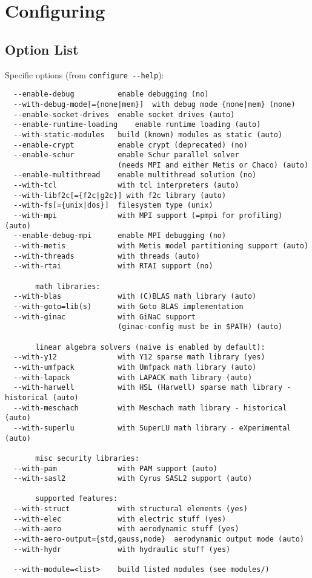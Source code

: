 \documentclass[10pt,dvips]{report}
\newcommand{\kw}[1]{\texttt{#1}}
\begin{document}
\section{Configuring}

\subsection{Option List}
Specific options (from \kw{configure -{}-help}):
{\small
\begin{verbatim}
  --enable-debug          enable debugging (no)
  --with-debug-mode[={none|mem}]  with debug mode {none|mem} (none)
  --enable-socket-drives  enable socket drives (auto)
  --enable-runtime-loading    enable runtime loading (auto)
  --with-static-modules   build (known) modules as static (auto)
  --enable-crypt          enable crypt (deprecated) (no)
  --enable-schur          enable Schur parallel solver
                          (needs MPI and either Metis or Chaco) (auto)
  --enable-multithread    enable multithread solution (no)
  --with-tcl              with tcl interpreters (auto)
  --with-libf2c[={f2c|g2c}] with f2c library (auto)
  --with-fs[={unix|dos}]  filesystem type (unix)
  --with-mpi              with MPI support (=pmpi for profiling) (auto)
  --enable-debug-mpi      enable MPI debugging (no)
  --with-metis            with Metis model partitioning support (auto)
  --with-threads          with threads (auto)
  --with-rtai             with RTAI support (no)

       math libraries:
  --with-blas             with (C)BLAS math library (auto)
  --with-goto=lib(s)      with Goto BLAS implementation
  --with-ginac            with GiNaC support
                          (ginac-config must be in $PATH) (auto)

       linear algebra solvers (naive is enabled by default):
  --with-y12              with Y12 sparse math library (yes)
  --with-umfpack          with Umfpack math library (auto)
  --with-lapack           with LAPACK math library (auto)
  --with-harwell          with HSL (Harwell) sparse math library - historical (auto)
  --with-meschach         with Meschach math library - historical (auto)
  --with-superlu          with SuperLU math library - eXperimental (auto)

       misc security libraries:
  --with-pam              with PAM support (auto)
  --with-sasl2            with Cyrus SASL2 support (auto)

       supported features:
  --with-struct           with structural elements (yes)
  --with-elec             with electric stuff (yes)
  --with-aero             with aerodynamic stuff (yes)
  --with-aero-output={std,gauss,node}  aerodynamic output mode (auto)
  --with-hydr             with hydraulic stuff (yes)

  --with-module=<list>    build listed modules (see modules/)
\end{verbatim}
}
\end{document}

